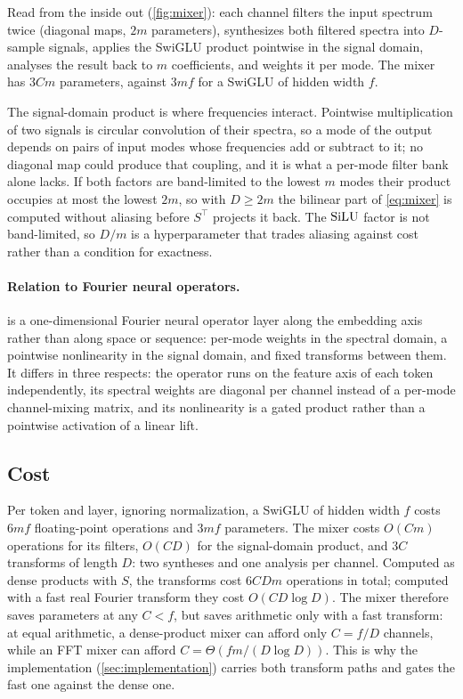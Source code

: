 Read from the inside out (\cref{fig:mixer}): each channel filters the input spectrum twice
(diagonal maps, $2m$ parameters), synthesizes both filtered spectra into
$D$-sample signals, applies the SwiGLU product \citep{shazeer2020glu} pointwise
in the signal domain, analyses the result back to $m$ coefficients, and
weights it per mode. The mixer has $3Cm$ parameters, against $3mf$ for a
SwiGLU of hidden width $f$.

The signal-domain product is where frequencies interact. Pointwise
multiplication of two signals is circular convolution of their spectra, so a
mode of the output depends on pairs of input modes whose frequencies add or
subtract to it; no diagonal map could produce that coupling, and it is what a
per-mode filter bank alone lacks. If both factors are band-limited to the
lowest $m$ modes their product occupies at most the lowest $2m$, so with
$D\ge 2m$ the bilinear part of \cref{eq:mixer} is computed without aliasing
before $S^\top$ projects it back. The $\operatorname{SiLU}$ factor is not band-limited, so
$D/m$ is a hyperparameter that trades aliasing against cost rather than a
condition for exactness.

\paragraph{Relation to Fourier neural operators.}  is a
one-dimensional Fourier neural operator layer \citep{li2020fno} along the
embedding axis rather than along space or sequence: per-mode weights in the
spectral domain, a pointwise nonlinearity in the signal domain, and fixed
transforms between them. It differs in three respects: the operator runs on
the feature axis of each token independently, its spectral weights are
diagonal per channel instead of a per-mode channel-mixing matrix, and its
nonlinearity is a gated product rather than a pointwise activation of a
linear lift.

\subsection{Cost}
\label{sec:cost}

Per token and layer, ignoring normalization, a SwiGLU of hidden width $f$
costs $6mf$ floating-point operations and $3mf$ parameters. The mixer costs
$O(Cm)$ operations for its filters, $O(CD)$ for the signal-domain product, and
$3C$ transforms of length $D$: two syntheses and one analysis per channel. Computed as dense products with $S$,
the transforms cost $6CDm$ operations in total; computed with a fast real
Fourier transform they cost $O(CD\log D)$. The mixer therefore saves
parameters at any $C<f$, but saves arithmetic only with a fast transform: at
equal arithmetic, a dense-product mixer can afford only $C=f/D$ channels,
while an FFT mixer can afford $C=\Theta(fm/(D\log D))$. This is why the
implementation (\cref{sec:implementation}) carries both transform paths and
gates the fast one against the dense one.
